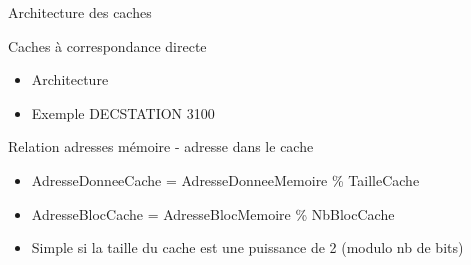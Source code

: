 %
\begin{Frame}{Architecture des caches}


      \begin{block}{Caches à correspondance directe}
       \begin{center}
 	\begin{itemize}
         \item Architecture
         \item Exemple DECSTATION 3100
        \end{itemize}
       \end{center}
      \end{block}   

  


  

  \begin{block}{Relation adresses mémoire - adresse dans le cache}
    \begin{center}
 	\begin{itemize}
        \item AdresseDonneeCache = AdresseDonneeMemoire \% TailleCache
	\item AdresseBlocCache = AdresseBlocMemoire \% NbBlocCache
	\item Simple si la taille du cache est une puissance de 2 (modulo nb de bits)
        \end{itemize}
    \end{center}
  \end{block}   

 

\end{Frame}


